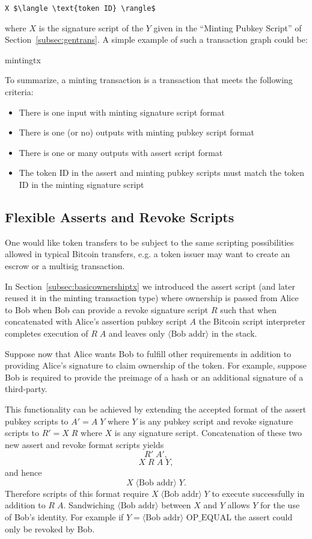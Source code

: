 \documentclass[9pt,oneside]{amsart}
\begin{document}
\begin{multicols}{2}
\begin{lstlisting}[title={\textbf{Minting Signature Script}}]
X $\langle \text{token ID} \rangle$
\end{lstlisting}
where $X$ is the signature script of the $Y$ given in the ``Minting Pubkey Script'' of Section~\ref{subsec:gentrans}. A simple example of such a transaction graph could be: 
\begin{center}
{mintingtx}
\end{center}

To summarize, a minting transaction is a transaction that meets the following criteria:
\begin{itemize}
    \item There is one input with minting signature script format
    \item There is one (or no) outputs with minting pubkey script format
    \item There is one or many outputs with assert script format
    \item The token ID in the assert and minting pubkey scripts must match the token ID in the minting signature script
\end{itemize}

\subsection{Flexible Asserts and Revoke Scripts}\label{subsec:flexassertrevoke}
One would like token transfers to be subject to the same scripting possibilities allowed in typical Bitcoin transfers, e.g. a token issuer may want to create an escrow or a multisig transaction.

In Section~\ref{subsec:basicownershiptx} we introduced the assert script (and later reused it in the minting transaction type) where ownership is passed from Alice to Bob when Bob can provide a revoke signature script $R$ such that when concatenated with Alice's assertion pubkey script $A$ the Bitcoin script interpreter completes execution of $R \; A$ and leaves only $\langle \text{Bob addr} \rangle$ in the stack. 

Suppose now that Alice wants Bob to fulfill other requirements in addition to providing Alice's signature to claim ownership of the token. For example, suppose Bob is required to provide the preimage of a hash or an additional signature of a third-party. 

This functionality can be achieved by extending the accepted format of the assert pubkey scripts to $A' = A \; Y$ where $Y$ is any pubkey script and revoke signature scripts to $R' = X \; R$ where $X$ is any signature script. Concatenation of these two new assert and revoke format scripts yields
\[R' \; A',\]
\[X \; R \; A \; Y,\]
and hence
\[X \; \langle \text{Bob addr} \rangle \; Y.\]
Therefore scripts of this format require $X \; \langle \text{Bob addr} \rangle \; Y$ to execute successfully in addition to $R \; A$. Sandwiching $\langle \text{Bob addr} \rangle$ between $X$ and $Y$ allows $Y$ for the use of Bob's identity. For example if $Y=\langle \text{Bob addr} \rangle \text{ OP\_EQUAL}$ the assert could only be revoked by Bob.


\end{multicols}
\end{document}
